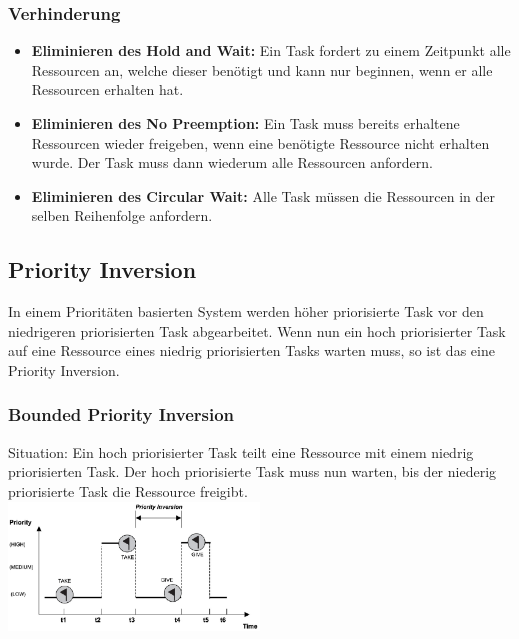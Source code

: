 \subsubsection{Verhinderung}
\begin{itemize}
    \item \textbf{Eliminieren des Hold and Wait:} Ein Task fordert zu einem Zeitpunkt alle Ressourcen an, welche dieser benötigt und kann nur beginnen, wenn er alle Ressourcen erhalten hat.
    \item \textbf{Eliminieren des No Preemption:} Ein Task muss bereits erhaltene Ressourcen wieder freigeben, wenn eine benötigte Ressource nicht erhalten wurde. Der Task muss dann wiederum alle Ressourcen anfordern.
    \item \textbf{Eliminieren des Circular Wait:} Alle Task müssen die Ressourcen in der selben Reihenfolge anfordern.
\end{itemize}

\subsection{Priority Inversion}
In einem Prioritäten basierten System werden höher priorisierte Task vor den niedrigeren priorisierten Task abgearbeitet. Wenn nun ein hoch priorisierter Task auf eine Ressource eines niedrig priorisierten Tasks warten muss, so ist das eine Priority Inversion.

\subsubsection{Bounded Priority Inversion}
Situation: Ein hoch priorisierter Task teilt eine Ressource mit einem niedrig priorisierten Task. Der hoch priorisierte Task muss nun warten, bis der niederig priorisierte Task die Ressource freigibt. \\
\includegraphics[width=0.5\textwidth]{images/Betriebssysteme/bounded_priority.png}

